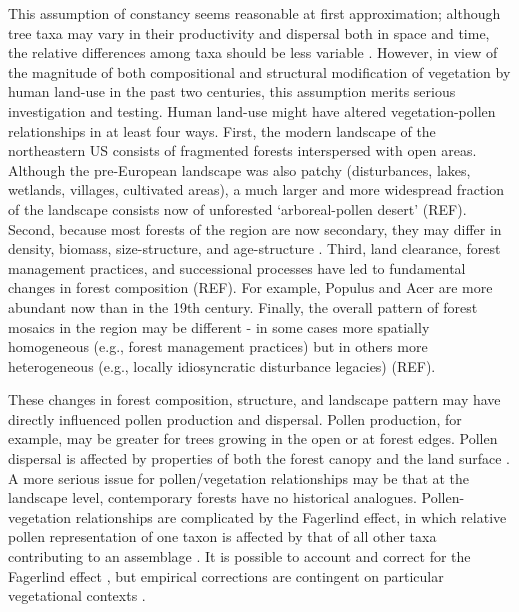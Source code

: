 \documentclass[12pt]{article}
\begin{document}
This assumption of constancy seems reasonable at first approximation;
although tree taxa may vary in their productivity and dispersal both
in space and time, the relative differences among taxa should be less
variable \citep{parsons1981statistical}.  However, in view of the
magnitude of both compositional and structural modification of
vegetation by human land-use in the past two centuries, this
assumption merits serious investigation and testing.  Human land-use
might have altered vegetation-pollen relationships in at least four
ways.  First, the modern landscape of the northeastern US consists of
fragmented forests interspersed with open areas.  Although the
pre-European landscape was also patchy (disturbances, lakes, wetlands,
villages, cultivated areas), a much larger and more widespread
fraction of the landscape consists now of unforested ‘arboreal-pollen
desert’ (REF).  Second, because most forests of the region are now
secondary, they may differ in density, biomass, size-structure, and
age-structure \citep{rhemtulla2009legacies}.  Third, land clearance,
forest management practices, and successional processes have led to
fundamental changes in forest composition (REF).  For example, Populus
and Acer are more abundant now than in the 19th century.  Finally, the
overall pattern of forest mosaics in the region may be different - in
some cases more spatially homogeneous (e.g., forest management
practices) but in others more heterogeneous (e.g., locally
idiosyncratic disturbance legacies) (REF).

These changes in forest composition, structure, and landscape pattern
may have directly influenced pollen production and dispersal.  Pollen
production, for example, may be greater for trees growing in the open
or at forest edges.  Pollen dispersal is affected by properties of
both the forest canopy and the land surface \citep{jackson1999pollen}.
A more serious issue for pollen/vegetation relationships may be that
at the landscape level, contemporary forests have no historical
analogues. Pollen-vegetation relationships are complicated by the
Fagerlind effect, in which relative pollen representation of one taxon
is affected by that of all other taxa contributing to an assemblage
\citep{prentice1988records}. It is possible to account and correct for
the Fagerlind effect \citep{prentice1986, jackson1995exploration}, but
empirical corrections are contingent on particular vegetational
contexts \citep{jackson1998quantitative}.
\end{document}
